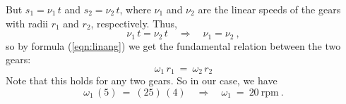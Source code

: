 \begin{exmp}
 But $s_1 = \nu_1 \,t$ and $s_2 = \nu_2 \,t$, where $\nu_1$ and $\nu_2$ are the linear speeds of the
 gears with radii $r_1$ and $r_2$, respectively. Thus,
 \begin{displaymath}
  \nu_1 \,t = \nu_2 \,t \quad\Rightarrow\quad \nu_1 = \nu_2 ~, 
 \end{displaymath}
 so by formula (\ref{eqn:linang}) we get the fundamental relation between the two gears:
 \begin{equation}
  \boxed{\omega_1 \,r_1 ~=~ \omega_2 \,r_2}\label{eqn:gears}
 \end{equation}
 Note that this holds for any two gears. So in our case, we have
 \begin{displaymath}
  \omega_1 \,(5) ~=~ (25) \,(4) \quad\Rightarrow\quad \boxed{\omega_1 ~=~ 20~\text{rpm}} ~.
 \end{displaymath}
\end{exmp}
\divider
\vspace{2mm}

